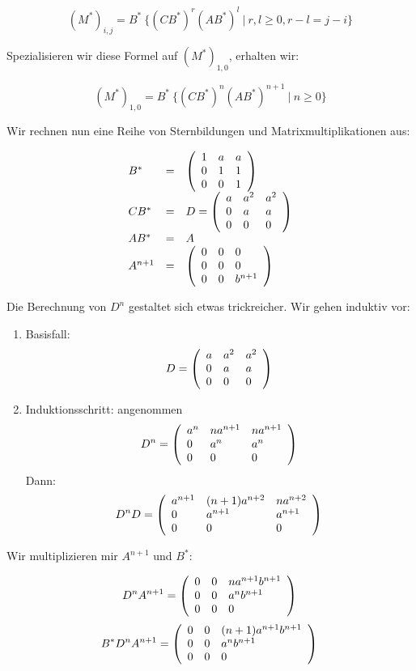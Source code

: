 \documentclass[]{scrartcl}
\newcommand{\matr}[2]{\left(\begin{array}{#1}#2\end{array}\right)}
\begin{document}
\begin{enumerate}
	$$
		(M^*)_{i,j} = B^*\ \{ (CB^*)^r(AB^*)^l\ |\ r,l \geq 0, r-l = j-i  \}
	$$
	
	Spezialisieren wir diese Formel auf $(M^*)_{1,0}$, erhalten wir:
	
	$$
		(M^*)_{1,0} = B^*\ \{ (CB^*)^n(AB^*)^{n+1}\ |\ n \geq 0 \}
	$$
	
	Wir rechnen nun eine Reihe von Sternbildungen und Matrixmultiplikationen aus:
	
	$$
		\begin{array}{l l l}
			B^* & = & \matr{l l l}{1 & a & a\\
							   0 & 1 & 1\\
							   0 & 0 & 1}\\
%
			CB^* & = & D = \matr{l l l}{a & a^2 & a^2\\
							    0 & a & a\\
							    0 & 0 & 0}\\
			AB^* & = & A\\
		    A^{n+1} & = & \matr{l l l}{0 & 0 & 0\\
								 0 & 0 & 0\\
								 0 & 0 & b^{n+1}}
		\end{array}
	$$
	
	Die Berechnung von $D^n$ gestaltet sich etwas trickreicher. Wir gehen induktiv vor:
	
	\begin{enumerate}
		\item Basisfall:
		$$
			D = \matr{l l l}{a & a^2 & a^2\\
	    					 0 & a & a\\
	    					 0 & 0 & 0}\\
		$$
		\item Induktionsschritt: angenommen
		$$
			D^n = \matr{l l l}{a^n & na^{n+1} & na^{n+1}\\
	    					   0 & a^n & a^n\\
	    					   0 & 0 & 0}\\
		$$Dann:
		$$
			D^nD = \matr{l l l}{a^{n+1} & (n+1)a^{n+2} & na^{n+2}\\
	    		 			    0 & a^{n+1} & a^{n+1}\\
	    	  				    0 & 0 & 0}\\
		$$
	\end{enumerate}
	
	Wir multiplizieren mir $A^{n+1}$ und $B^*$:
	
	$$
			D^nA^{n+1} = \matr{l l l}{0 & 0 & na^{n+1}b^{n+1}\\
							       0   & 0  & a^nb^{n+1}\\
							   	   0   & 0    & 0}\\
	$$
	$$
			B^*D^nA^{n+1} = \matr{l l l}{0 & 0 & (n+1)a^{n+1}b^{n+1}\\
							       0   & 0  & a^nb^{n+1}\\
							   	   0   & 0    & 0}\\
	$$
	

\end{enumerate}
\end{document}
